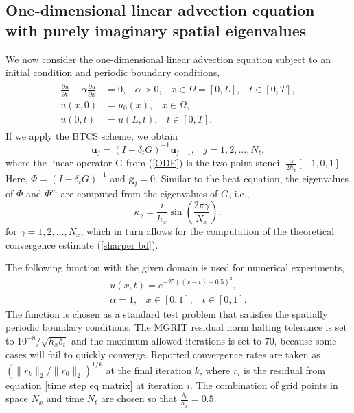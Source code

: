 \documentclass[VANCOUVER,STIX1COL]{WileyNJD-v2}
\begin{document}
\subsection{One-dimensional linear advection equation with purely imaginary spatial eigenvalues}
\label{sec:results_adv_imag} 
We now consider the one-dimensional linear advection equation subject to an initial condition and periodic boundary conditions,
\begin{align}
\begin{split}
\frac{\partial u}{\partial t} - \alpha \frac{\partial u}{\partial x} &= 0, 
\hspace{10pt} \alpha > 0, \hspace{10pt} x \in \Omega = [0, L], \hspace{10pt} t \in [0, T], \\
u(x, 0) &= u_0(x), \hspace{10pt} x \in \Omega, \\
u(0, t) &= u(L, t), \hspace{10pt} t \in [0, T].
\end{split}
\end{align}
If we apply the BTCS scheme, we obtain
\begin{equation*}
\mathbf{u}_j = (I - \delta_t G)^{-1} \mathbf{u}_{j-1}, \hspace{10pt} j=1,2,...,N_t,
\end{equation*}
where the linear operator G from (\ref{ODE}) is the two-point stencil $\frac{\alpha}{2h_x} [-1, 0, 1]$. Here, $\Phi = (I - \delta_t G)^{-1}$ and $\mathbf{g}_j = 0$. Similar to the heat equation, the eigenvalues of $\Phi$ and $\Phi^m$ are computed from the eigenvalues of $G$, i.e., 
$$\kappa_{\gamma} = \frac{i}{h_x} \sin \left(\frac{2 \pi \gamma}{N_x}\right),$$
for $\gamma = 1, 2, ..., N_x$, 
which in turn allows for the computation of the theoretical convergence estimate (\ref{sharper bd}).


The following function with the given domain is used for numerical experiments, 
\begin{subequations}
\begin{align}
u(x, t) = e^{-25((x - t) - 0.5)^2}, \label{eq:LA_eqn1} \\
\alpha = 1, \hspace{10pt} x \in [0, 1], \hspace{10pt} t \in [0, 1]  \label{eq:LA_eqn2}.
\end{align}
\end{subequations}
The function is chosen as a standard test problem that satisfies the spatially periodic boundary conditions.
The MGRIT residual norm halting tolerance is set to $ 10^{-8} / \sqrt{h_x \delta_t}$ and the maximum allowed
iterations is set to $70$, because some cases will fail to quickly converge. 
Reported convergence rates are taken as $( \| r_k \|_2 / \| r_0 \|_2 )^{1/k}$ at the final iteration $k$, where $r_i$ is the residual from equation \eqref{time step eq matrix} at iteration $i$.  The combination of grid points in space $N_x$ and time $N_t$ are chosen so that $\frac{\delta_t}{h_x} = 0.5$.
\end{document}
